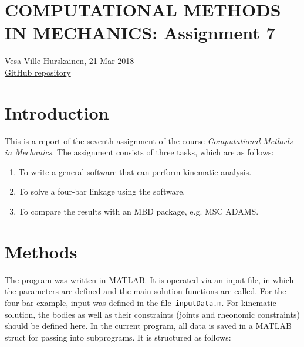 \documentclass{article}
\begin{document}
	\section*{COMPUTATIONAL METHODS IN MECHANICS: Assignment 7}
	Vesa-Ville Hurskainen, 21 Mar 2018\\
	\href{https://github.com/VesaVilleHurskainen/cmim2018}{GitHub repository}

	\section*{Introduction}
	This is a report of the seventh assignment of the course \textit{Computational Methods in Mechanics}. The assignment consists of three tasks, which are as follows:
	\begin{enumerate}
		\setlength\itemsep{0pt}
		\item To write a general software that can perform kinematic analysis.
		\item To solve a four-bar linkage using the software.
		\item To compare the results with an MBD package, e.g. MSC ADAMS.
	\end{enumerate}

	\section*{Methods}
	The program was written in MATLAB. It is operated via an input file, in which the parameters are defined and the main solution functions are called. For the four-bar example, input was defined in the file~\texttt{inputData.m}. For kinematic solution, the bodies as well as their constraints (joints and rheonomic constraints) should be defined here. In the current program, all data is saved in a MATLAB struct for passing into subprograms. It is structured as follows:\\
	
\end{document}
